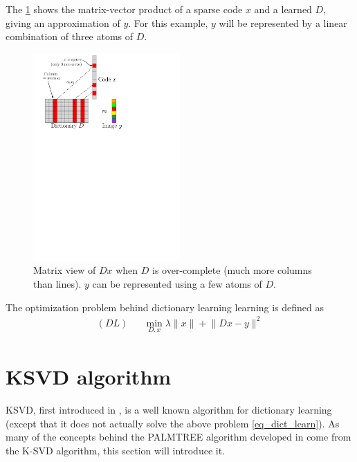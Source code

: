 The \cref{fig_overcomplete_matrix} shows the matrix-vector product of a sparse code $x$ and a learned $D$, giving an approximation of $y$. For this example, $y$ will be represented by a linear combination of three atoms of $D$.


\begin{figure}[!h] \centering
\includegraphics[width=0.5\textwidth]{figures/sparsity-matrix.pdf}
\caption{Matrix view of $Dx$ when $D$ is over-complete (much more columns than lines). $y$ can be represented using a few atoms of $D$.} \label{fig_overcomplete_matrix}
\end{figure}


The optimization problem behind dictionary learning learning is defined as
\begin{equation*} \label{eq_dict_learn} \begin{aligned}
(DL) && \underset{D,x}{\min} \lambda \lVert x \rVert + \lVert Dx-y \rVert^2 
\end{aligned} \end{equation*}

\section{\ac{KSVD} algorithm}
 
\ac{KSVD}, first introduced in \cite{aharon_k-svd:_2006}, is a well known algorithm for dictionary learning (except that it does not actually solve the above problem \cref{eq_dict_learn}). As many of the concepts behind the PALMTREE algorithm developed in \cite{chabiron_optimization_2016} come from the K-SVD algorithm, this section will introduce it.

